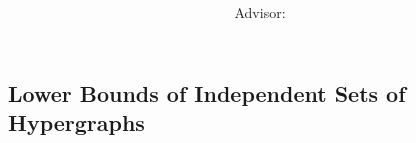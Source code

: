\documentclass{article}
\title{
    \vspace{2in}
    \textsc{\Large\hmwkInstitution} \\
    \vspace{0.2in}
    \textmd{\textbf{\hmwkTitle}}
}
\author{
  \textit{\hmwkAuthorName} \\
  \vspace{0.002in} \\
  Advisor: \textit{\hmwkAdvisor}
}
\date{}
\begin{document}
\maketitle

\thispagestyle{empty}
\clearpage
{} 

\pagebreak


\begin{center}
    \section*{Lower Bounds of Independent Sets of Hypergraphs}
\end{center}

\vspace{0.2in}
\end{document}
